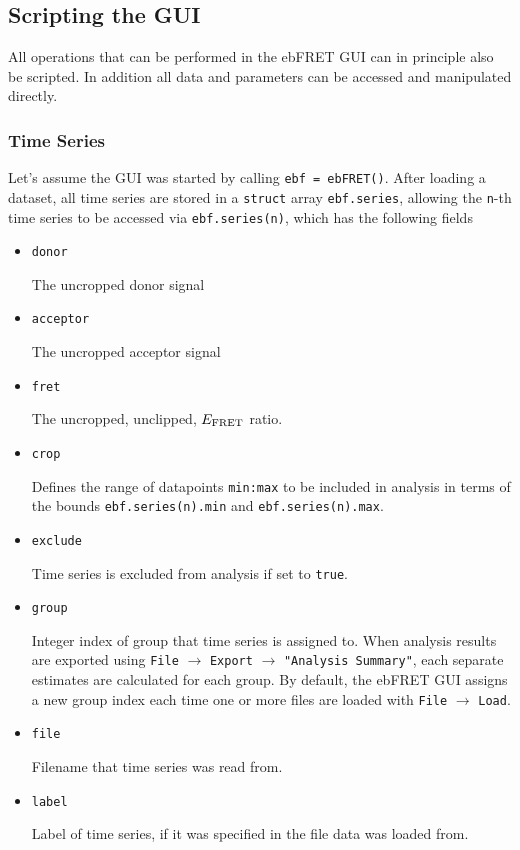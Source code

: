 \documentclass[12pt,article,oldfontcommands]{memoir}
\begin{document}
\subsection{Scripting the GUI}

All operations that can be performed in the ebFRET GUI can in principle also be scripted. In addition all data and parameters can be accessed and manipulated directly. 

\subsubsection{Time Series}

Let's assume the GUI was started by calling \texttt{ebf = ebFRET()}. After loading a dataset, all time series are stored in a \texttt{struct} array \texttt{ebf.series}, allowing the \texttt{n}-th time series to be accessed via \texttt{ebf.series(n)}, which has the following fields

\begin{itemize}
\item \texttt{donor}

The uncropped donor signal

\item \texttt{acceptor}

The uncropped acceptor signal

\item \texttt{fret}

The uncropped, unclipped, $E_{\rm FRET}$ ratio.

\item \texttt{crop}

Defines the range of datapoints \texttt{min:max} to be included in analysis in terms of the bounds \texttt{ebf.series(n).min} and \texttt{ebf.series(n).max}.

\item \texttt{exclude}

Time series is excluded from analysis if set to \texttt{true}.

\item \texttt{group}

Integer index of group that time series is assigned to. When analysis results are exported using \texttt{File} $\to$ \texttt{Export} $\to$ \texttt{"Analysis Summary"}, each separate estimates are calculated for each group. By default, the ebFRET GUI assigns a new group index each time one or more files are loaded with \texttt{File} $\to$ \texttt{Load}.

\item \texttt{file}

Filename that time series was read from.

\item \texttt{label}

Label of time series, if it was specified in the file data was loaded from.

\end{itemize}
\end{document}
